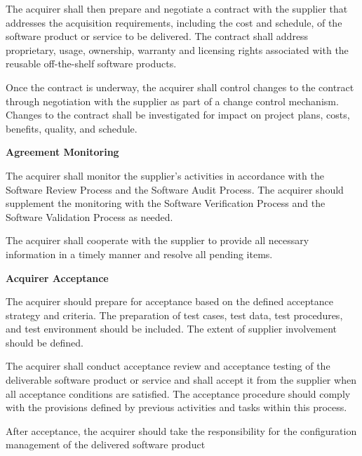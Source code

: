 \begin{adjustwidth}{2em}{0pt}
\begin{compactenum}
\begin{compactenum}
						\item The acquirer shall then prepare and negotiate a contract with the supplier that addresses the acquisition requirements, including the cost and schedule, of the software product or service to be delivered. The contract shall address proprietary, usage, ownership, warranty and licensing rights associated with the reusable off-the-shelf software products.

						\item Once the contract is underway, the acquirer shall control changes to the contract through negotiation with the supplier as part of a change control mechanism. Changes to the contract shall be investigated for impact on project plans, costs, benefits, quality, and schedule.
					\end{compactenum}

					\item {\bf Agreement Monitoring}
					\begin{compactenum}
						\item The acquirer shall monitor the supplier's activities in accordance with the Software Review Process and the Software Audit Process. The acquirer should supplement the monitoring with the Software Verification Process and the Software Validation Process as needed. 

						\item The acquirer shall cooperate with the supplier to provide all necessary information in a timely manner and resolve all pending items. 
					\end{compactenum}

					\item {\bf Acquirer Acceptance}
					\begin{compactenum}
						\item The acquirer should prepare for acceptance based on the defined acceptance strategy and criteria. The preparation of test cases, test data, test procedures, and test environment should be included. The extent of supplier involvement should be defined.

						\item The acquirer shall conduct acceptance review and acceptance testing of the deliverable software product or service and shall accept it from the supplier when all acceptance conditions are satisfied. The acceptance procedure should comply with the provisions defined by previous activities and tasks within this process.

						\item After acceptance, the acquirer should take the responsibility for the configuration management of the delivered software product
					\end{compactenum}


\end{compactenum}
\end{adjustwidth}
